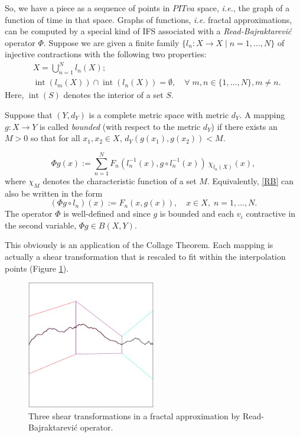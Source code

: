 \documentclass[english,11pt,letterpaper,onecolumn]{scrartcl}
\numberwithin{equation}{section}
\newcommand{\Int}{\mathop{\mathrm{int}}}
\newcommand{\be}{\begin{equation}}
\newcommand{\ee}{\end{equation}}
\begin{document}
So, we have a piece as a sequence of points in $PITva$ space, \textit{i.e.}, 
the graph of a function of time in that space. Graphs of functions, 
\textit{i.e.} fractal approximations, can be computed by a special kind of IFS 
associated with a \textit{Read-Bajraktarevi\'c} operator $\Phi$. Suppose we are 
given a finite family $\{l_n : X\to X \mid n = 1, \ldots, N\}$ of injective 
contractions with the following two properties: 
\begin{align}
&X = \bigcup_{n=1}^N l_n(X);\label{union}\\
&\Int (l_m(X))\cap \Int(l_n(X)) = \emptyset, \quad\forall\;m, n\in \{1,\ldots, 
N\}, m\neq n.\label{partition} 
\end{align}
Here, $\Int (S)$ denotes the interior of a set $S$.

Suppose that $(Y,d_Y)$ is a complete metric space with metric $d_Y$. A mapping 
$g:X\to Y$ is called \emph{bounded} (with respect to the metric $d_Y$) if there 
exists an $M> 0$ so that for all $x_1, x_2\in X$, $d_Y(g(x_1),g(x_2)) < M$.


\be\label{RB}
\Phi g (x) := \sum\limits_{n=1}^N F_n (l_n^{-1} (x), g\circ l_n^{-1} 
(x))\,\chi_{l_n(X)}(x), 
\ee
where $\chi_M$ denotes the characteristic function of a set $M$. Equivalently, 
\eqref{RB} can also be written in the form
\be\label{3.3}
(\Phi g \circ l_n) (x) := F_n (x, g(x)),\quad x\in X, \;n = 1, \ldots, N. 
\ee
The operator $\Phi$ is well-defined and since $g$ is bounded and each $v_i$ 
contractive in the second variable, $\Phi g\in B(X,Y)$.



This obviously is an application of the Collage Theorem. Each mapping is 
actually a shear transformation that is rescaled 
to fit within the interpolation points (Figure \ref{fig:rboperator}).

    \begin{figure}
        \centerline{\includegraphics[width = 0.5\textwidth]{interp}}
        \caption{\label{fig:rboperator} Three shear transformations in 
a fractal approximation by Read-Bajraktarevi\'c operator.\protect\footnotemark}
    \end{figure}
\end{document}
